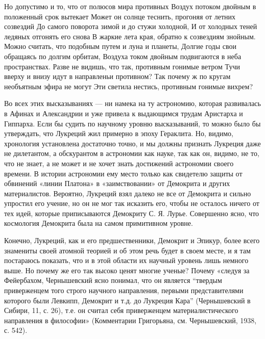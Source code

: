 Но допустимо и то, что от полюсов мира противных Воздух потоком
двойным в положенный срок вытекает Может он солнце теснить, прогоняя
от летних созвездий До самого поворота зимой и до стужи холодной, И от
холодных теней ледяных отгонять его снова В жаркие лета края, обратно
к созвездиям знойным. Можно считать, что подобным путем и луна и
планеты, Долгие годы свои обращаясь по долгим орбитам, Воздуха током
двойным подвигаются в неба пространствах. Разве не видишь, что так,
противным гонимые ветром Тучи вверху и внизу идут в направленьи
противном? Так почему ж по кругам необъятным эфира не могут Эти
светила нестись, противным гонимые вихрем?

Во всех этих высказываниях --- ни намека на ту астрономию, которая
развивалась в Афинах и Александрии и уже привела к выдающимся трудам
Аристарха и Гиппарха. Если бы судить по научному уровню высказываний,
то можно было бы утверждать, что Лукреций жил примерно в эпоху
Гераклита. Но, видимо, хронология установлена достаточно точно, и мы
должны признать Лукреция даже не дилетантом, а обскурантом в
астрономии как науке, так как он, видимо, не то, что не знает, а не
может и не хочет знать достижений астрономии своего времени. В истории
астрономии ему место только как свидетелю защиты от обвинений «линии
Платона» в «заимствовании» от Демокрита и других материалистов.
Вероятно, Лукреций взял далеко не все от Демокрита и сильно упростил
его учение, но он не мог так исказить его, чтобы не осталось ничего от
тех идей, которые приписываются Демокриту С. Я. Лурье. Совершенно
ясно, что космология Демокрита была на самом примитивном уровне.

Конечно, Лукреций, как и его предшественники, Демокрит и Эпикур, более
всего знамениты своей атомной теорией и об этом речь будет в своем
месте, и я там постараюсь показать, что и в этой области их научный
уровень лишь немного выше. Но почему же его так высоко ценят многие
ученые? Почему «следуя за Фейербахом, Чернышевский ясно понимал, что
он является ``твердым приверженцем того строго научного направления,
первыми представителями которого были Левкипп, Демокрит и т.д. до
Лукреция Кара'' (Чернышевский в Сибири, 11, с. 26), т.е. он считал
себя приверженцем материалистического направления в философии»
(Комментарии Григорьяна, см. Чернышевский, 1938, с. 542).

